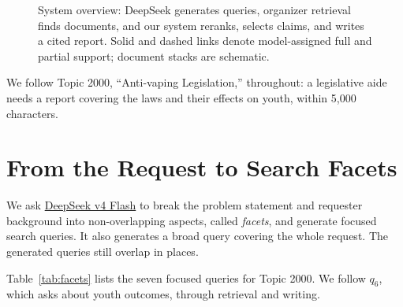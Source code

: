 \documentclass[11pt,letterpaper]{article}
\begin{document}
\begin{figure}[!ht]
\caption{System overview: DeepSeek generates queries, organizer retrieval finds documents, and our system reranks, selects claims, and writes a cited report. Solid and dashed links denote model-assigned full and partial support; document stacks are schematic.}
\label{fig:task}
\end{figure}
\FloatBarrier

We follow Topic 2000, ``Anti-vaping Legislation,'' throughout: a legislative aide needs a report covering the laws and their effects on youth, within 5,000 characters.

\section{From the Request to Search Facets}
We ask \href{https://huggingface.co/deepseek-ai/DeepSeek-V4-Flash}{\textcolor{sea}{DeepSeek v4 Flash}} to break the problem statement and requester background into non-overlapping aspects, called \emph{facets}, and generate focused search queries. It also generates a broad query covering the whole request. The generated queries still overlap in places.

Table~\ref{tab:facets} lists the seven focused queries for Topic 2000. We follow $q_6$, which asks about youth outcomes, through retrieval and writing.
\end{document}
